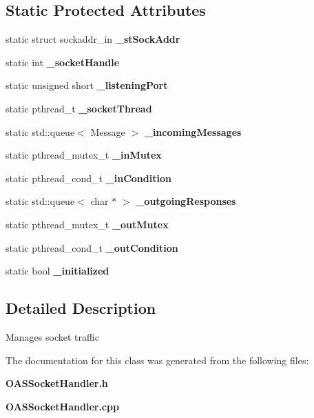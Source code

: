 \subsection*{Static Protected Attributes}
\begin{CompactItemize}
\item 
static struct sockaddr\_\-in \textbf{\_\-st\-Sock\-Addr}\label{classoas_1_1SocketHandler_ba06d47f147551945d2c207f8543c0ce}

\item 
static int \textbf{\_\-socket\-Handle}\label{classoas_1_1SocketHandler_7ad4faf26e4cdcf7c46501cda4b0e754}

\item 
static unsigned short \textbf{\_\-listening\-Port}\label{classoas_1_1SocketHandler_35c9ea66dd0dfb29a5e6852752354f8d}

\item 
static pthread\_\-t \textbf{\_\-socket\-Thread}\label{classoas_1_1SocketHandler_56e4c411e5878b9b50b0a88808f8b13a}

\item 
static std::queue$<$ Message $>$ \textbf{\_\-incoming\-Messages}\label{classoas_1_1SocketHandler_9b4711ca6a518d33b4b9ed62814bb6ea}

\item 
static pthread\_\-mutex\_\-t \textbf{\_\-in\-Mutex}\label{classoas_1_1SocketHandler_9662777ddd18caeab83fe193776baa25}

\item 
static pthread\_\-cond\_\-t \textbf{\_\-in\-Condition}\label{classoas_1_1SocketHandler_652447dd07371df4cfef272c533500a4}

\item 
static std::queue$<$ char $\ast$ $>$ \textbf{\_\-outgoing\-Responses}\label{classoas_1_1SocketHandler_1cd0ba35dbf5d633683ce666c907a7b8}

\item 
static pthread\_\-mutex\_\-t \textbf{\_\-out\-Mutex}\label{classoas_1_1SocketHandler_e96fff8dc13e19082ff9b4b3f172ac35}

\item 
static pthread\_\-cond\_\-t \textbf{\_\-out\-Condition}\label{classoas_1_1SocketHandler_c5f7d69983beb5da4a6bd1a649e5acc2}

\item 
static bool \textbf{\_\-initialized}\label{classoas_1_1SocketHandler_2479ea6dc9de54fbc50440a796aac78e}

\end{CompactItemize}


\subsection{Detailed Description}
Manages socket traffic 



The documentation for this class was generated from the following files:\begin{CompactItemize}
\item 
\bf{OASSocket\-Handler.h}\item 
\bf{OASSocket\-Handler.cpp}\end{CompactItemize}
